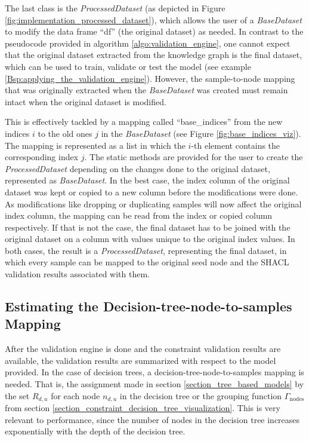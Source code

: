 The last class is the \emph{ProcessedDataset} (as depicted in Figure \ref{fig:implementation_processed_dataset}), which allows the user of a \emph{BaseDataset} to modify the data frame ``df'' (the original dataset) as needed. In contrast to the pseudocode provided in algorithm \ref{algo:validation_engine}, one cannot expect that the original dataset extracted from the knowledge graph is the final dataset, which can be used to train, validate or test the model (see example \ref{Bsp:applying_the_validation_engine}). However, the sample-to-node mapping that was originally extracted when the \emph{BaseDataset} was created must remain intact when the original dataset is modified. 

This is effectively tackled by a mapping called ``base\_indices'' from the new indices $i$ to the old ones $j$ in the \emph{BaseDataset} (see Figure \ref{fig:base_indices_viz}). The mapping is represented as a list in which the $i$-th element contains the corresponding index $j$. The static methods are provided for the user to create the \emph{ProcessedDataset} depending on the changes done to the original dataset, represented as \emph{BaseDataset}. In the best case, the index column of the original dataset was kept or copied to a new column before the modifications were done. As modifications like dropping or duplicating samples will now affect the original index column, the mapping can be read from the index or copied column respectively. If that is not the case, the final dataset has to be joined with the original dataset on a column with values unique to the original index values.
In both cases, the result is a \emph{ProcessedDataset}, representing the final dataset, in which every sample can be mapped to the original seed node and the SHACL validation results associated with them.

\subsection{Estimating the Decision-tree-node-to-samples Mapping}
\label{section_decision_tree_node_to_samples_mapping}
After the validation engine is done and the constraint validation results are available, the validation results are summarized with respect to the model provided. In the case of decision trees, a decision-tree-node-to-samples mapping is needed. That is, the assignment made in section \ref{section_tree_based_models} by the set $R_{d,u}$ for each node $n_{d,u}$ in the decision tree or the grouping function $\Gamma_\text{nodes}$ from section \ref{section_constraint_decision_tree_visualization}. This is very relevant to performance, since the number of nodes in the decision tree increases exponentially with the depth of the decision tree.

